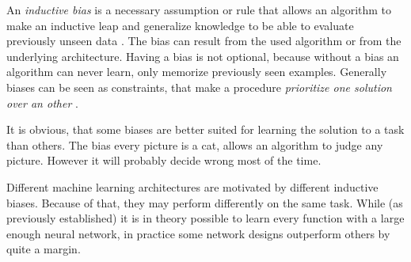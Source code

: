 An \emph{inductive bias} is a necessary assumption or rule that allows an algorithm to make an inductive leap and generalize knowledge to be able to evaluate previously unseen data \cite{needForBias}.
The bias can result from the used algorithm or from the underlying architecture.
Having a bias is not optional, because without a bias an algorithm can never \glqq learn\grqq{}, only memorize previously seen examples.
Generally biases can be seen as constraints, that make a procedure \emph{prioritize one solution over an other} \cite[]{relationalInductiveBiasesAndGraphNetworks}. 

It is obvious, that some biases are better suited for learning the solution to a task than others. 
The bias \glqq every picture is a cat\grqq{}, allows an algorithm to judge any picture. 
However it will probably decide wrong most of the time.

Different machine learning architectures are motivated by different inductive biases. 
Because of that, they may perform differently on the same task.
While (as previously established) it is in theory possible to learn every function with a large enough neural network, in practice some network designs outperform others by quite a margin.